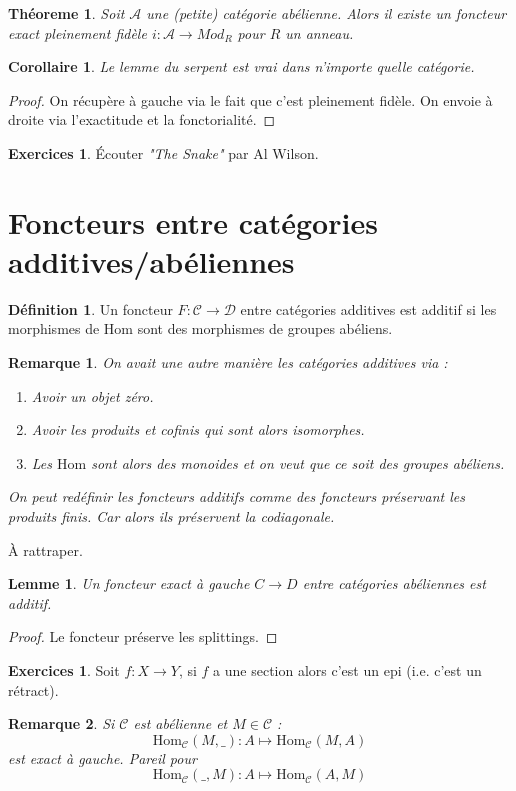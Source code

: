 \documentclass[a4paper,12pt]{book}
\newcommand{\Cat}{\mathcal{C}}
\newcommand{\Hom}{\textrm{Hom}}
\theoremstyle{plain}
\newtheorem{thm}[subsection]{Théoreme}
\newtheorem{lem}[subsection]{Lemme}
\newtheorem{cor}[subsection]{Corollaire}
\newtheorem{rem}{Remarque}
\theoremstyle{definition}
\newtheorem{defn}[subsection]{Définition}
\newtheorem{exo}[subsection]{Exercices}
\theoremstyle{remark}
\begin{document}
\begin{thm}
    Soit $\mathcal A$ une (petite) catégorie abélienne. Alors il existe
    un foncteur exact pleinement fidèle $i\colon\mathcal A\to Mod_R$ 
    pour $R$ un anneau.
\end{thm}
\begin{cor}
    Le lemme du serpent est vrai dans n'importe quelle catégorie.
\end{cor}
\begin{proof}
    On récupère à gauche via le fait que c'est pleinement fidèle.
    On envoie à droite via l'exactitude et la fonctorialité. 
\end{proof}

\begin{exo}
    Écouter \textit{"The Snake"} par Al Wilson.
\end{exo}

\section{Foncteurs entre catégories additives/abéliennes}
\begin{defn}
    Un foncteur $F\colon \Cat\to \mathcal D$ entre catégories additives
    est additif si les morphismes de $\Hom$ sont des morphismes
    de groupes abéliens.
\end{defn}

\begin{rem}
    On avait une autre manière les catégories additives via :
    \begin{enumerate}
	\item Avoir un objet zéro.
	\item Avoir les produits et cofinis qui sont alors isomorphes.
	\item Les $\Hom$ sont alors des monoides et on veut que ce
	    soit des groupes abéliens.
    \end{enumerate}
    On peut redéfinir les foncteurs additifs comme des foncteurs
    préservant les produits finis. Car alors ils préservent la codiagonale.
\end{rem}


À rattraper.

\begin{lem}
    Un foncteur exact à gauche $C\to D$ entre catégories abéliennes
    est additif.
\end{lem}
\begin{proof}
    Le foncteur préserve les splittings. 
\end{proof}
\begin{exo}
    Soit $f\colon X\to Y$, si $f$ a une section alors c'est un
    epi (i.e. c'est un rétract).
\end{exo}
\begin{rem}
    Si $\Cat$ est abélienne et $M\in \Cat$ :
    \[\Hom_{\Cat}(M,\_)\colon A\mapsto \Hom_{\Cat}(M,A)\]
    est exact à gauche. Pareil pour
    \[\Hom_{\Cat}(\_, M)\colon A\mapsto \Hom_{\Cat}(A, M)\]
\end{rem}
\end{document}
